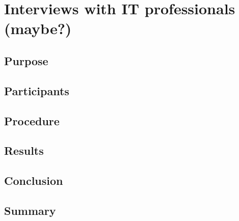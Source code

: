 \chapter{Interviews with IT professionals (maybe?)}

\section{Purpose}
\section{Participants}
\section{Procedure}
\section{Results}
\section{Conclusion}
\section{Summary}